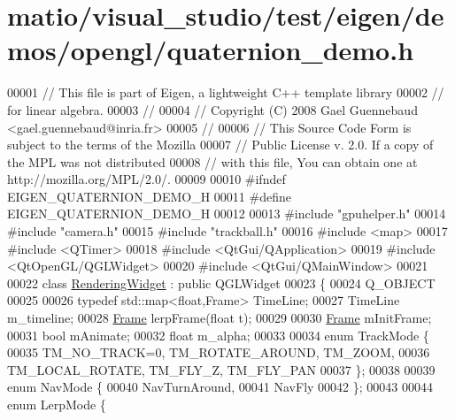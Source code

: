 \hypertarget{matio_2visual__studio_2test_2eigen_2demos_2opengl_2quaternion__demo_8h_source}{}\section{matio/visual\+\_\+studio/test/eigen/demos/opengl/quaternion\+\_\+demo.h}
\label{matio_2visual__studio_2test_2eigen_2demos_2opengl_2quaternion__demo_8h_source}

\begin{DoxyCode}
00001 \textcolor{comment}{// This file is part of Eigen, a lightweight C++ template library}
00002 \textcolor{comment}{// for linear algebra.}
00003 \textcolor{comment}{//}
00004 \textcolor{comment}{// Copyright (C) 2008 Gael Guennebaud <gael.guennebaud@inria.fr>}
00005 \textcolor{comment}{//}
00006 \textcolor{comment}{// This Source Code Form is subject to the terms of the Mozilla}
00007 \textcolor{comment}{// Public License v. 2.0. If a copy of the MPL was not distributed}
00008 \textcolor{comment}{// with this file, You can obtain one at http://mozilla.org/MPL/2.0/.}
00009 
00010 \textcolor{preprocessor}{#ifndef EIGEN\_QUATERNION\_DEMO\_H}
00011 \textcolor{preprocessor}{#define EIGEN\_QUATERNION\_DEMO\_H}
00012 
00013 \textcolor{preprocessor}{#include "gpuhelper.h"}
00014 \textcolor{preprocessor}{#include "camera.h"}
00015 \textcolor{preprocessor}{#include "trackball.h"}
00016 \textcolor{preprocessor}{#include <map>}
00017 \textcolor{preprocessor}{#include <QTimer>}
00018 \textcolor{preprocessor}{#include <QtGui/QApplication>}
00019 \textcolor{preprocessor}{#include <QtOpenGL/QGLWidget>}
00020 \textcolor{preprocessor}{#include <QtGui/QMainWindow>}
00021 
00022 \textcolor{keyword}{class }\hyperlink{class_rendering_widget}{RenderingWidget} : \textcolor{keyword}{public} QGLWidget
00023 \{
00024   Q\_OBJECT
00025 
00026     \textcolor{keyword}{typedef} std::map<float,Frame> TimeLine;
00027     TimeLine m\_timeline;
00028     \hyperlink{class_frame}{Frame} lerpFrame(\textcolor{keywordtype}{float} t);
00029 
00030     \hyperlink{class_frame}{Frame} mInitFrame;
00031     \textcolor{keywordtype}{bool} mAnimate;
00032     \textcolor{keywordtype}{float} m\_alpha;
00033 
00034     \textcolor{keyword}{enum} TrackMode \{
00035       TM\_NO\_TRACK=0, TM\_ROTATE\_AROUND, TM\_ZOOM,
00036       TM\_LOCAL\_ROTATE, TM\_FLY\_Z, TM\_FLY\_PAN
00037     \};
00038 
00039     \textcolor{keyword}{enum} NavMode \{
00040       NavTurnAround,
00041       NavFly
00042     \};
00043 
00044     \textcolor{keyword}{enum} LerpMode \{

\end{DoxyCode}
